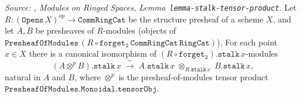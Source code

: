 \begin{lemma}\label{mk-lem:stalk_tensor_commutation}

  \textit{Source: \cite{stacks-project}, Modules on Ringed Spaces,
  Lemma~\texttt{lemma-stalk-tensor-product}.}
  Let \(R : (\mathtt{Opens}\,X)^{op} \to \mathtt{CommRingCat}\) be the structure
  presheaf of a scheme \(X\), and let \(A, B\) be presheaves of
  \(R\)-modules (objects of \(\mathtt{PresheafOfModules}\,(R \circ
  \mathtt{forget_2}\,\mathtt{CommRingCat}\,\mathtt{RingCat})\)). For each point
  \(x \in X\) there is a canonical isomorphism of \((R \circ
  \mathtt{forget_2}).\mathtt{stalk}\,x\)-modules
  \[
    (A \otimes^{p} B).\mathtt{stalk}\,x
      \;\xrightarrow{\ \sim\ }\;
    A.\mathtt{stalk}\,x \;\otimes_{R.\mathtt{stalk}\,x}\; B.\mathtt{stalk}\,x,
  \]
  natural in \(A\) and \(B\), where \(\otimes^{p}\) is the presheaf-of-modules tensor
  product \(\mathtt{PresheafOfModules.Monoidal.tensorObj}\).
\end{lemma}

